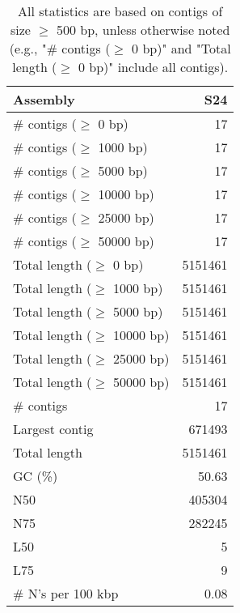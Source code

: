 \documentclass[12pt,a4paper]{article}
\begin{document}
\begin{table}[ht]
\begin{center}
\caption{All statistics are based on contigs of size $\geq$ 500 bp, unless otherwise noted (e.g., "\# contigs ($\geq$ 0 bp)" and "Total length ($\geq$ 0 bp)" include all contigs).}
\begin{tabular}{|l*{1}{|r}|}
\hline
Assembly & S24 \\ \hline
\# contigs ($\geq$ 0 bp) & 17 \\ \hline
\# contigs ($\geq$ 1000 bp) & 17 \\ \hline
\# contigs ($\geq$ 5000 bp) & 17 \\ \hline
\# contigs ($\geq$ 10000 bp) & 17 \\ \hline
\# contigs ($\geq$ 25000 bp) & 17 \\ \hline
\# contigs ($\geq$ 50000 bp) & 17 \\ \hline
Total length ($\geq$ 0 bp) & 5151461 \\ \hline
Total length ($\geq$ 1000 bp) & 5151461 \\ \hline
Total length ($\geq$ 5000 bp) & 5151461 \\ \hline
Total length ($\geq$ 10000 bp) & 5151461 \\ \hline
Total length ($\geq$ 25000 bp) & 5151461 \\ \hline
Total length ($\geq$ 50000 bp) & 5151461 \\ \hline
\# contigs & 17 \\ \hline
Largest contig & 671493 \\ \hline
Total length & 5151461 \\ \hline
GC (\%) & 50.63 \\ \hline
N50 & 405304 \\ \hline
N75 & 282245 \\ \hline
L50 & 5 \\ \hline
L75 & 9 \\ \hline
\# N's per 100 kbp & 0.08 \\ \hline
\end{tabular}
\end{center}
\end{table}
\end{document}
